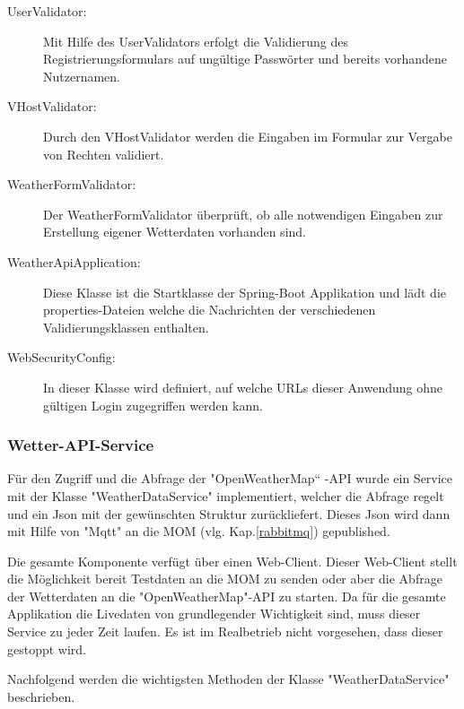 \begin{description}
\item[UserValidator:]Mit Hilfe des UserValidators erfolgt die Validierung des Registrierungsformulars auf ungültige Passwörter und bereits vorhandene Nutzernamen.
\item[VHostValidator:]Durch den VHostValidator werden die Eingaben im Formular zur Vergabe von Rechten validiert. 
\item[WeatherFormValidator:]Der WeatherFormValidator überprüft, ob alle notwendigen Eingaben zur Erstellung eigener Wetterdaten vorhanden sind.
\item[WeatherApiApplication:]Diese Klasse ist die Startklasse der Spring-Boot Applikation und lädt die properties-Dateien welche die Nachrichten der verschiedenen Validierungsklassen enthalten.
\item[WebSecurityConfig:]In dieser Klasse wird definiert, auf welche URLs dieser Anwendung ohne gültigen Login zugegriffen werden kann.

\end{description}

\subsubsection{Wetter-API-Service}

Für den Zugriff und die Abfrage der "OpenWeatherMap“ -API wurde ein Service mit der Klasse "WeatherDataService" implementiert, welcher die Abfrage regelt und ein Json mit der gewünschten Struktur zurückliefert. Dieses Json wird dann mit Hilfe von "Mqtt" an die MOM (vlg. Kap.\ref{rabbitmq}) gepublished. 

Die gesamte Komponente verfügt über einen Web-Client. Dieser Web-Client stellt die Möglichkeit bereit Testdaten an die MOM zu senden oder aber die Abfrage der Wetterdaten an die "OpenWeatherMap"-API zu starten. Da für die gesamte Applikation die Livedaten von grundlegender Wichtigkeit sind, muss dieser Service zu jeder Zeit laufen. Es ist im Realbetrieb nicht vorgesehen, dass dieser gestoppt wird.

Nachfolgend werden die wichtigsten Methoden der Klasse "WeatherDataService" beschrieben. 

